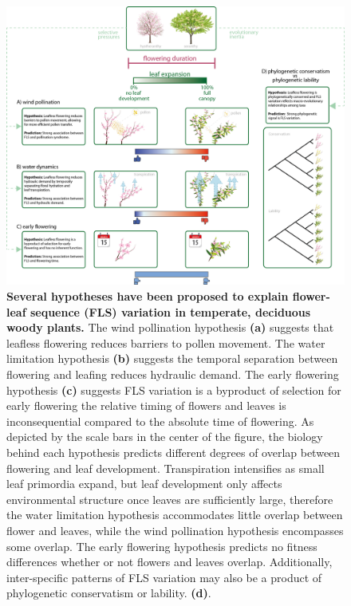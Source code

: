 \documentclass[11pt]{article}
\begin{document}
\begin{figure}[h!]
    \centering
 \includegraphics[width=\textwidth]{..//..//HarvardForest/concept_hystheranty_wide_text_overlaps.png}  
    \caption{\textbf{Several hypotheses have been proposed to explain flower-leaf sequence (FLS) variation in temperate, deciduous woody plants.}  The wind pollination hypothesis \textbf{(a)} suggests that leafless flowering reduces barriers to pollen movement. The water limitation hypothesis \textbf{(b)} suggests the temporal separation between flowering and leafing reduces hydraulic demand. The early flowering hypothesis \textbf{(c)} suggests FLS variation is a byproduct of selection for early flowering the relative timing of flowers and leaves is inconsequential compared to the absolute time of flowering. As depicted by the scale bars in the center of the figure, the biology behind each hypothesis predicts different degrees of overlap between flowering and leaf development. Transpiration intensifies as small leaf primordia expand, but leaf development only affects environmental structure once leaves are sufficiently large, therefore the water limitation hypothesis accommodates little overlap between flower and leaves, while the wind pollination hypothesis encompasses some overlap. The early flowering hypothesis predicts no fitness differences whether or not flowers and leaves overlap. Additionally, inter-specific patterns of FLS variation may also be a product of phylogenetic conservatism or lability. \textbf{(d)}.}
    \label{fig:conceptual}
\end{figure}
 
\end{document}
